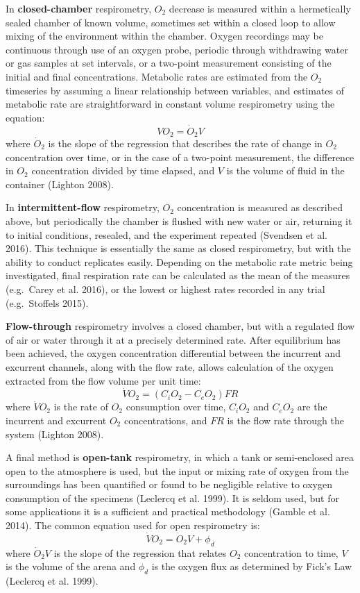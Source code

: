 \documentclass[]{book}
\begin{document}
In \textbf{closed-chamber} respirometry, \(O_2\) decrease is measured
within a hermetically sealed chamber of known volume, sometimes set
within a closed loop to allow mixing of the environment within the
chamber. Oxygen recordings may be continuous through use of an oxygen
probe, periodic through withdrawing water or gas samples at set
intervals, or a two-point measurement consisting of the initial and
final concentrations. Metabolic rates are estimated from the \(O_2\)
timeseries by assuming a linear relationship between variables, and
estimates of metabolic rate are straightforward in constant volume
respirometry using the equation: \[VO_2 = \dot O_2V\] where \(\dot O_2\)
is the slope of the regression that describes the rate of change in
\(O_2\) concentration over time, or in the case of a two-point
measurement, the difference in \(O_2\) concentration divided by time
elapsed, and \(V\) is the volume of fluid in the container (Lighton
2008).

In \textbf{intermittent-flow} respirometry, \(O_2\) concentration is
measured as described above, but periodically the chamber is flushed
with new water or air, returning it to initial conditions, resealed, and
the experiment repeated (Svendsen et al. 2016). This technique is
essentially the same as closed respirometry, but with the ability to
conduct replicates easily. Depending on the metabolic rate metric being
investigated, final respiration rate can be calculated as the mean of
the measures (e.g.~Carey et al. 2016), or the lowest or highest rates
recorded in any trial (e.g.~Stoffels 2015).

\textbf{Flow-through} respirometry involves a closed chamber, but with a
regulated flow of air or water through it at a precisely determined
rate. After equilibrium has been achieved, the oxygen concentration
differential between the incurrent and excurrent channels, along with
the flow rate, allows calculation of the oxygen extracted from the flow
volume per unit time: \[\dot{V}O_2 = (C_iO_2 - C_eO_2)FR\] where
\(\dot{V}O_2\) is the rate of \(O_2\) consumption over time, \(C_iO_2\)
and \(C_eO_2\) are the incurrent and excurrent \(O_2\) concentrations,
and \(FR\) is the flow rate through the system (Lighton 2008).

A final method is \textbf{open-tank} respirometry, in which a tank or
semi-enclosed area open to the atmosphere is used, but the input or
mixing rate of oxygen from the surroundings has been quantified or found
to be negligible relative to oxygen consumption of the specimens
(Leclercq et al. 1999). It is seldom used, but for some applications it
is a sufficient and practical methodology (Gamble et al. 2014). The
common equation used for open respirometry is:
\[\dot{V}O_2 = \dot O_2V + \phi_d\] where \(\dot O_2V\) is the slope of
the regression that relates \(O_2\) concentration to time, \(V\) is the
volume of the arena and \(\phi_d\) is the oxygen flux as determined by
Fick's Law (Leclercq et al. 1999).
\end{document}
